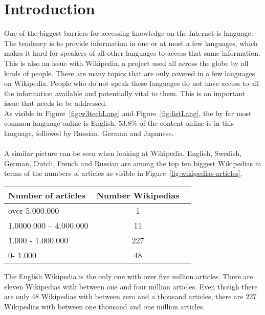 \chapter{Introduction}

One of the biggest barriers for accessing knowledge on the Internet is language. The tendency is to provide information in one or at most a few languages, which makes it hard for speakers of all other languages to access that same information. This is also an issue with Wikipedia, a project used all across the globe by all kinds of people. There are many topics that are only covered in a few languages on Wikipedia. People who do not speak these languages do not have access to all the information available and potentially vital to them. This is an important issue that needs to be addressed. \\
As visible in Figure~\ref{fig:w3techLang} and Figure~\ref{fig:listLang}, the by far most common language online is English. 53.8\% of the content online is in this language, followed by Russian, German and Japanese. \citep{w3techLang} \\
\\
A similar picture can be seen when looking at Wikipedia. English, Swedish, German, Dutch, French and Russian are among the top ten biggest Wikipedias in terms of the numbers of articles as visible in Figure~\ref{fig:wikipedias-articles}. \\
\begin{center}
\begin{tabular}{| l | c | r |}
  \hline			
  Number of articles & Number Wikipedias \\ \hline
  over 5.000.000 & 1 \\
  1.0000.000 -- 4.000.000 & 11 \\
  1.000 - 1.000.000 & 227 \\
  0- 1.000 & 48 \\
  \hline  
\end{tabular}
\end{center}

The English Wikipedia is the only one with over five million articles. There are eleven Wikipedias with between one and four million articles. Even though there are only 48 Wikipedias with between zero and a thousand articles, there are 227 Wikipedias with between one thousand and one million articles. \citep{wiki:30} \\

